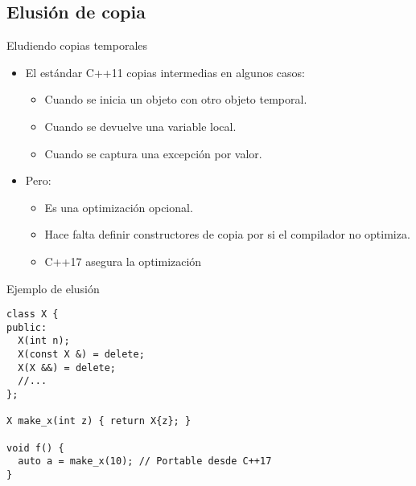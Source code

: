 \subsection{Elusión de copia}

\begin{frame}[t]{Eludiendo copias temporales}
\begin{itemize}
  \item El estándar C++11  copias intermedias en algunos casos:
    \begin{itemize}
      \item Cuando se inicia un objeto con otro objeto temporal.
      \item Cuando se devuelve una variable local.
      \item Cuando se captura una excepción por valor.
    \end{itemize}
  \vfill\pause
  \item Pero:
    \begin{itemize}
      \item Es una optimización opcional.
      \item Hace falta definir constructores de copia por si el compilador no optimiza.
      \item C++17 asegura la optimización
    \end{itemize}
\end{itemize}
\end{frame}

\begin{frame}[t,fragile]{Ejemplo de elusión}
\begin{lstlisting}
class X {
public:
  X(int n);
  X(const X &) = delete;
  X(X &&) = delete;
  //...
};

X make_x(int z) { return X{z}; }

void f() {
  auto a = make_x(10); // Portable desde C++17
}
\end{lstlisting}
\end{frame}
